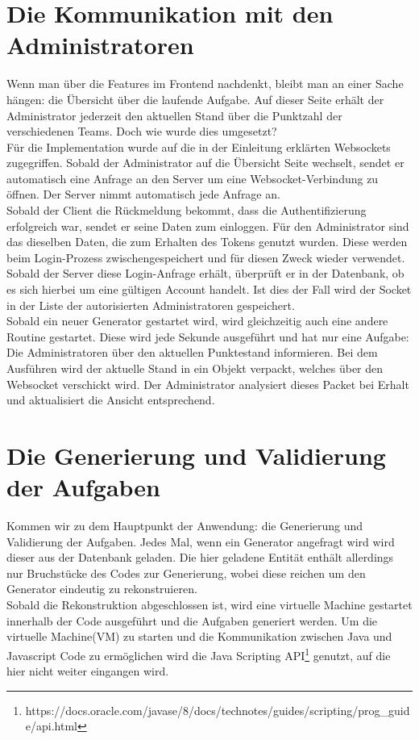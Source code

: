 \section{Die Kommunikation mit den Administratoren}

Wenn man über die Features im Frontend nachdenkt, bleibt man an einer Sache hängen: die Übersicht über die laufende Aufgabe. Auf dieser Seite erhält der Administrator jederzeit den aktuellen Stand über die Punktzahl der verschiedenen Teams. Doch wie wurde dies umgesetzt? \\

Für die Implementation wurde auf die in der Einleitung erklärten Websockets zugegriffen. Sobald der Administrator auf die Übersicht Seite wechselt, sendet er automatisch eine Anfrage an den Server um eine Websocket-Verbindung zu öffnen. Der Server nimmt automatisch jede Anfrage an. \\
Sobald der Client die Rückmeldung bekommt, dass die Authentifizierung erfolgreich war, sendet er seine Daten zum einloggen. Für den Administrator sind das dieselben Daten, die zum Erhalten des Tokens genutzt wurden. Diese werden beim Login-Prozess zwischengespeichert und für diesen Zweck wieder verwendet. \\
Sobald der Server diese Login-Anfrage erhält, überprüft er in der Datenbank, ob es sich hierbei um eine gültigen Account handelt. Ist dies der Fall wird der Socket in der Liste der autorisierten Administratoren gespeichert. \\

Sobald ein neuer Generator gestartet wird, wird gleichzeitig auch eine andere Routine gestartet. Diese wird jede Sekunde ausgeführt und hat nur eine Aufgabe: Die Administratoren über den aktuellen Punktestand informieren. Bei dem Ausführen wird der aktuelle Stand in ein Objekt verpackt, welches über den Websocket verschickt wird. Der Administrator analysiert dieses Packet bei Erhalt und aktualisiert die Ansicht entsprechend.


\section{Die Generierung und Validierung der Aufgaben}

Kommen wir zu dem Hauptpunkt der Anwendung: die Generierung und Validierung der Aufgaben. Jedes Mal, wenn ein Generator angefragt wird wird dieser aus der Datenbank geladen. Die hier geladene Entität enthält allerdings nur Bruchstücke des Codes zur Generierung, wobei diese reichen um den Generator eindeutig zu rekonstruieren.\\
Sobald die Rekonstruktion abgeschlossen ist, wird eine virtuelle Machine gestartet innerhalb der Code ausgeführt und die Aufgaben generiert werden. Um die virtuelle Machine(VM) zu starten und die Kommunikation zwischen Java und Javascript Code zu ermöglichen wird die Java Scripting API\footnote{https://docs.oracle.com/javase/8/docs/technotes/guides/scripting/prog\_guide/api.html} genutzt, auf die hier nicht weiter eingangen wird. \\

